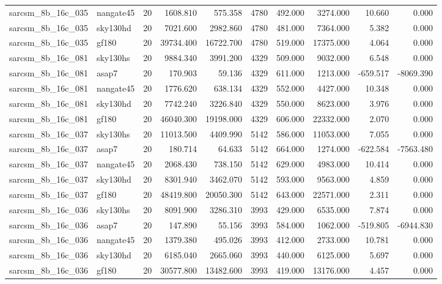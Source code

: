 \documentclass{article}
\begin{document}
\begin{longtable}{llrrrrrrrr}
sarcsm\_8b\_16c\_035 & nangate45 & 20 & 1608.810 & 575.358 & 4780 & 492.000 & 3274.000 & 10.660 & 0.000 \\
sarcsm\_8b\_16c\_035 & sky130hd & 20 & 7021.600 & 2982.860 & 4780 & 481.000 & 7364.000 & 5.382 & 0.000 \\
sarcsm\_8b\_16c\_035 & gf180 & 20 & 39734.400 & 16722.700 & 4780 & 519.000 & 17375.000 & 4.064 & 0.000 \\
sarcsm\_8b\_16c\_081 & sky130hs & 20 & 9884.340 & 3991.200 & 4329 & 509.000 & 9032.000 & 6.548 & 0.000 \\
sarcsm\_8b\_16c\_081 & asap7 & 20 & 170.903 & 59.136 & 4329 & 611.000 & 1213.000 & -659.517 & -8069.390 \\
sarcsm\_8b\_16c\_081 & nangate45 & 20 & 1776.620 & 638.134 & 4329 & 552.000 & 4427.000 & 10.348 & 0.000 \\
sarcsm\_8b\_16c\_081 & sky130hd & 20 & 7742.240 & 3226.840 & 4329 & 550.000 & 8623.000 & 3.976 & 0.000 \\
sarcsm\_8b\_16c\_081 & gf180 & 20 & 46040.300 & 19198.000 & 4329 & 606.000 & 22332.000 & 2.070 & 0.000 \\
sarcsm\_8b\_16c\_037 & sky130hs & 20 & 11013.500 & 4409.990 & 5142 & 586.000 & 11053.000 & 7.055 & 0.000 \\
sarcsm\_8b\_16c\_037 & asap7 & 20 & 180.714 & 64.633 & 5142 & 664.000 & 1274.000 & -622.584 & -7563.480 \\
sarcsm\_8b\_16c\_037 & nangate45 & 20 & 2068.430 & 738.150 & 5142 & 629.000 & 4983.000 & 10.414 & 0.000 \\
sarcsm\_8b\_16c\_037 & sky130hd & 20 & 8301.940 & 3462.070 & 5142 & 593.000 & 9563.000 & 4.859 & 0.000 \\
sarcsm\_8b\_16c\_037 & gf180 & 20 & 48419.800 & 20050.300 & 5142 & 643.000 & 22571.000 & 2.311 & 0.000 \\
sarcsm\_8b\_16c\_036 & sky130hs & 20 & 8091.900 & 3286.310 & 3993 & 429.000 & 6535.000 & 7.874 & 0.000 \\
sarcsm\_8b\_16c\_036 & asap7 & 20 & 147.890 & 55.156 & 3993 & 584.000 & 1062.000 & -519.805 & -6944.830 \\
sarcsm\_8b\_16c\_036 & nangate45 & 20 & 1379.380 & 495.026 & 3993 & 412.000 & 2733.000 & 10.781 & 0.000 \\
sarcsm\_8b\_16c\_036 & sky130hd & 20 & 6185.040 & 2665.060 & 3993 & 440.000 & 6125.000 & 5.697 & 0.000 \\
sarcsm\_8b\_16c\_036 & gf180 & 20 & 30577.800 & 13482.600 & 3993 & 419.000 & 13176.000 & 4.457 & 0.000 \\

\end{longtable}
\end{document}
